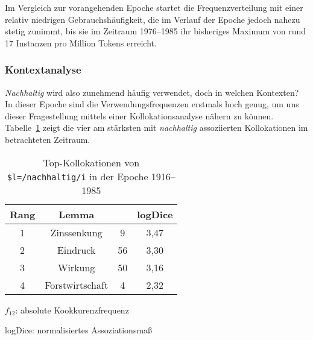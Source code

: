 \documentclass[
    german,
    a4paper,%
    12pt,%
    oneside,%
    toc=bibliography,
    final,
]{scrartcl}
\begin{document}
Im Vergleich zur vorangehenden Epoche startet die Frequenzverteilung mit einer relativ niedrigen Gebrauchshäufigkeit, die im Verlauf der Epoche jedoch nahezu stetig zunimmt, bis sie im Zeitraum 1976–1985 ihr bisheriges Maximum von rund 17 Instanzen pro Million Tokens erreicht.

\subsubsection{Kontextanalyse}

\textit{Nachhaltig} wird also zunehmend häufig verwendet, doch in welchen Kontexten? In dieser Epoche sind die Verwendungsfrequenzen erstmals hoch genug, um uns dieser Fragestellung mittels einer Kollokationsanalyse nähern zu können. Tabelle~\ref{tab:kollokationen-epoche3} zeigt die vier am stärksten mit \textit{nachhaltig} assoziierten Kollokationen im betrachteten Zeitraum.

\begin{table}[h!]
	\centering
	\renewcommand{\arraystretch}{1.5}
	
	\caption{Top-Kollokationen von \lstinline|$l=/nachhaltig/i| in der Epoche 1916–1985\protect\footnotemark}
	\label{tab:kollokationen-epoche3}
	
	\begin{threeparttable}
	
	\begin{tabular}{cccc}
	\textbf{Rang} & \textbf{Lemma} & \boldmath{$f_{12}$} & \textbf{logDice} \\ \hline
	1 & Zinssenkung & 9 & 3,47 \\ \hline
	2 & Eindruck & 56 & 3,30 \\ \hline
	3 & Wirkung & 50 & 3,16 \\ \hline
	4 & Forstwirtschaft & 4 & 2,32 \\ \hline
	\end{tabular} 
	
	\begin{tablenotes}
	\footnotesize
	\setlength{\itemindent}{-1.2em}
	\item $f_{12}$: absolute Kookkurenzfrequenz
	\item logDice: normalisiertes Assoziationsmaß
	\end{tablenotes}
	
	\end{threeparttable}
\end{table}
\end{document}

